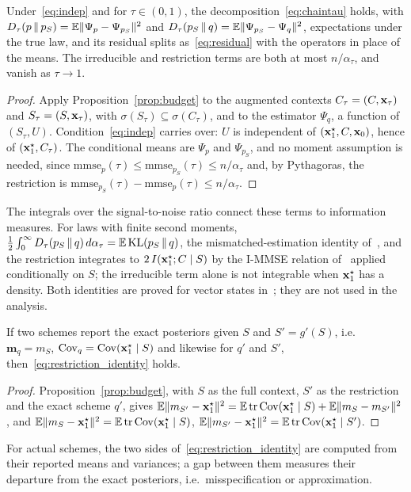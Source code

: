 \begin{proposition}\label{prop:chaintau}
Under~\eqref{eq:indep} and for $\tau \in (0,1)$, the decomposition~\eqref{eq:chaintau} holds, with
$D_\tau(p \,\|\, p_S) = \mathbb{E}\|\Psi_p - \Psi_{p_S}\|^2$ and $D_\tau(p_S \,\|\, q) = \mathbb{E}\|\Psi_{p_S} - \Psi_q\|^2$,
expectations under the true law, and its residual splits as~\eqref{eq:residual} with the operators in place of the
means. The irreducible and restriction terms are both at most $n/\alpha_\tau$, and vanish as $\tau \to 1$.
\end{proposition}
\begin{proof}
Apply Proposition~\ref{prop:budget} to the augmented contexts $C_\tau = (C, \mathbf{x}_\tau)$ and $S_\tau = (S, \mathbf{x}_\tau)$,
with $\sigma(S_\tau) \subseteq \sigma(C_\tau)$, and to the estimator $\Psi_q$, a function of $(S_\tau, U)$. Condition~\eqref{eq:indep}
carries over: $U$ is independent of $(\mathbf{x}_1^\star, C, \mathbf{x}_0)$, hence of $(\mathbf{x}_1^\star, C_\tau)$. The conditional means
are $\Psi_p$ and $\Psi_{p_S}$, and no moment assumption is needed, since
$\mathrm{mmse}_p(\tau) \le \mathrm{mmse}_{p_S}(\tau) \le n/\alpha_\tau$ and, by Pythagoras, the restriction is
$\mathrm{mmse}_{p_S}(\tau) - \mathrm{mmse}_p(\tau) \le n/\alpha_\tau$.
\end{proof}

The integrals over the signal-to-noise ratio connect these terms to information measures. For laws with finite
second moments, $\tfrac12\int_0^\infty D_\tau(p_S \,\|\, q)\, d\alpha_\tau = \mathbb{E}\,\mathrm{KL}(p_S \,\|\, q)$, the
mismatched-estimation identity of~\cite{verdu_mismatched_2010}, and the restriction integrates to
$2\, I(\mathbf{x}_1^\star; C \mid S)$ by the I-MMSE relation of~\cite{guo_mutual_2005} applied conditionally on $S$; the
irreducible term alone is not integrable when $\mathbf{x}_1^\star$ has a density. Both identities are proved for vector
states in~\cite{fablet_flow_2026}; they are not used in the analysis.

\begin{proposition}\label{prop:restriction}
If two schemes report the exact posteriors given $S$ and $S' = g'(S)$, i.e.\ $\mathbf{m}_q = m_S$,
$\operatorname{Cov}_q = \operatorname{Cov}(\mathbf{x}_1^\star \mid S)$ and likewise for $q'$ and $S'$, then~\eqref{eq:restriction_identity} holds.
\end{proposition}
\begin{proof}
Proposition~\ref{prop:budget}, with $S$ as the full context, $S'$ as the restriction and the exact scheme $q'$, gives
$\mathbb{E}\|m_{S'} - \mathbf{x}_1^\star\|^2 = \mathbb{E}\operatorname{tr}\operatorname{Cov}(\mathbf{x}_1^\star \mid S) + \mathbb{E}\|m_S - m_{S'}\|^2$, and
$\mathbb{E}\|m_S - \mathbf{x}_1^\star\|^2 = \mathbb{E}\operatorname{tr}\operatorname{Cov}(\mathbf{x}_1^\star \mid S)$, $\mathbb{E}\|m_{S'} - \mathbf{x}_1^\star\|^2 = \mathbb{E}\operatorname{tr}\operatorname{Cov}(\mathbf{x}_1^\star \mid S')$.
\end{proof}
For actual schemes, the two sides of~\eqref{eq:restriction_identity} are computed from their reported means and
variances; a gap between them measures their departure from the exact posteriors, i.e.\ misspecification or
approximation.

